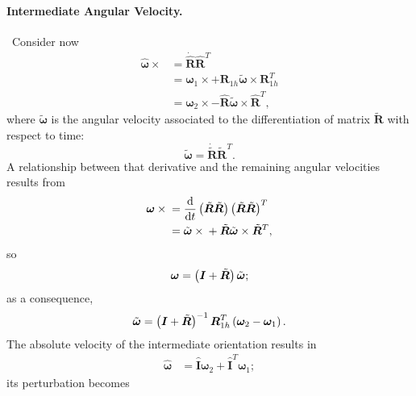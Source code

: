 \documentclass[10pt,dvips,fleqn,subeqn]{report}
\newcommand{\T}[1]{\bm{#1}}
\newcommand{\TT}[1]{\bm{#1}}
\begin{document}
\paragraph{Intermediate Angular Velocity.} \
Consider now
\begin{align}
	\hat{\T{\omega}}\times{}
	&= \dot{\hat{\T{R}}} \hat{\T{R}}^T \nonumber \\
	&= \T{\omega}_{1} \times
		+ \T{R}_{1h} \tilde{\T{\omega}}\times \T{R}_{1h}^T \nonumber \\
	&= \T{\omega}_{2} \times
		- \hat{\T{R}} \tilde{\T{\omega}}\times \hat{\T{R}}^T ,
\end{align}
where $\tilde{\T{\omega}}$ is the angular velocity associated
to the differentiation of matrix $\tilde{\T{R}}$ with respect to time:
\begin{equation}
	\tilde{\T{\omega}}
	= \dot{\tilde{\T{R}}} \tilde{\T{R}}^T .
\end{equation}
A relationship between that derivative and the remaining angular velocities
results from
\begin{align}
	\T{\omega} \times{}
	&= \frac{\mathrm{d}}{\mathrm{d}t}\plbr{
		\tilde{\T{R}} \tilde{\T{R}}
	} \plbr{
		\tilde{\T{R}} \tilde{\T{R}}
	}^T \nonumber \\
	&= \tilde{\T{\omega}} \times{}
	+ \tilde{\T{R}} \tilde{\T{\omega}} \times \tilde{\T{R}}^T ,
\end{align}
so
\begin{equation}
	\T{\omega} = \plbr{\T{I} + \tilde{\T{R}}} \tilde{\T{\omega}} ;
\end{equation}
as a consequence,
\begin{equation}
	\tilde{\T{\omega}}
	= \plbr{\T{I} + \tilde{\T{R}}}^{-1} \T{R}_{1h}^T \plbr{
		\T{\omega}_2 - \T{\omega}_1
	} .
\end{equation}
The absolute velocity of the intermediate orientation results in
\begin{align}
	\hat{\T{\omega}}
	&= \hat{\TT{I}} \T{\omega}_2
	+ \hat{\TT{I}}^T \T{\omega}_1 ;
	\label{eq:deformable-displacement-invariant-hat-omega}
\end{align}
its perturbation becomes
\end{document}
